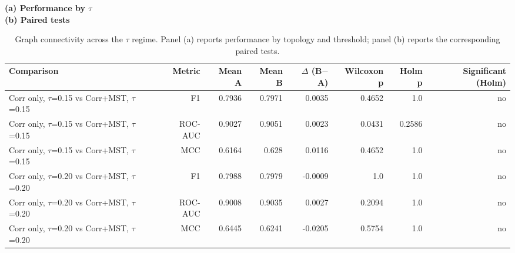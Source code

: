\begin{table}[t]
\centering
\caption{Graph connectivity across the $\tau$ regime. Panel (a) reports performance by topology and threshold; panel (b) reports the corresponding paired tests.}
\label{tab:msttau}
\label{tab:msttaustats}
\footnotesize
\textbf{(a) Performance by $\tau$}\\[2pt]
\vspace{7pt}
\textbf{(b) Paired tests}\\[2pt]
\begin{tabular}{lrrrrrrr}
\toprule
Comparison & Metric & Mean A & Mean B & $\Delta$ (B$-$A) & Wilcoxon p & Holm p & Significant (Holm) \\
\midrule
Corr only, $\tau$=0.15 vs Corr+MST, $\tau$=0.15 & F1 & 0.7936 & 0.7971 & 0.0035 & 0.4652 & 1.0 & no \\
Corr only, $\tau$=0.15 vs Corr+MST, $\tau$=0.15 & ROC-AUC & 0.9027 & 0.9051 & 0.0023 & 0.0431 & 0.2586 & no \\
Corr only, $\tau$=0.15 vs Corr+MST, $\tau$=0.15 & MCC & 0.6164 & 0.628 & 0.0116 & 0.4652 & 1.0 & no \\
Corr only, $\tau$=0.20 vs Corr+MST, $\tau$=0.20 & F1 & 0.7988 & 0.7979 & -0.0009 & 1.0 & 1.0 & no \\
Corr only, $\tau$=0.20 vs Corr+MST, $\tau$=0.20 & ROC-AUC & 0.9008 & 0.9035 & 0.0027 & 0.2094 & 1.0 & no \\
Corr only, $\tau$=0.20 vs Corr+MST, $\tau$=0.20 & MCC & 0.6445 & 0.6241 & -0.0205 & 0.5754 & 1.0 & no \\
\bottomrule
\end{tabular}
\end{table}
